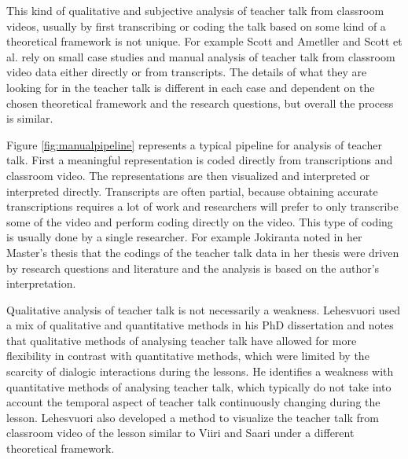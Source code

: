 \documentclass[utf8,english]{gradu3}
\begin{document}
This kind of qualitative and subjective analysis of teacher talk from classroom videos, usually by first transcribing or coding the talk based on some kind of a theoretical framework is not unique. For example Scott and Ametller \parencite*{scottTeachingScienceMeaningful2007} and Scott et al. \parencite*{scottPedagogicalLinkMaking2011} rely on small case studies and manual analysis of teacher talk from classroom video data either directly or from transcripts. The details of what they are looking for in the teacher talk is different in each case and dependent on the chosen theoretical framework and the research questions, but overall the process is similar. 

Figure \ref{fig:manualpipeline} represents a typical pipeline for analysis of teacher talk. First a meaningful representation is coded directly from transcriptions and classroom video. The representations are then visualized and interpreted or interpreted directly. Transcripts are often partial, because obtaining accurate transcriptions requires a lot of work and researchers will prefer to only transcribe some of the video and perform coding directly on the video. This type of coding is usually done by a single researcher. For example Jokiranta \parencite*{jokirantaNatureTeacherDiscourse2014} noted in her Master's thesis that the codings of the teacher talk data in her thesis were driven by research questions and literature and the analysis is based on the author's interpretation.

Qualitative analysis of teacher talk is not necessarily a weakness. Lehesvuori \parencite*{lehesvuoriDialogicTeachingScience2013} used a mix of qualitative and quantitative methods in his PhD dissertation and notes that qualitative methods of analysing teacher talk have allowed for more flexibility in contrast with quantitative methods, which were limited by the scarcity of dialogic interactions during the lessons. He identifies a weakness with quantitative methods of analysing teacher talk, which typically do not take into account the temporal aspect of teacher talk continuously changing during the lesson. Lehesvuori \parencite*{lehesvuoriVisualizingCommunicationStructures2013} also developed a method to visualize the teacher talk from classroom video of the lesson similar to Viiri and Saari \parencite*{viiriTeacherTalkPatterns2006} under a different theoretical framework.
\end{document}
